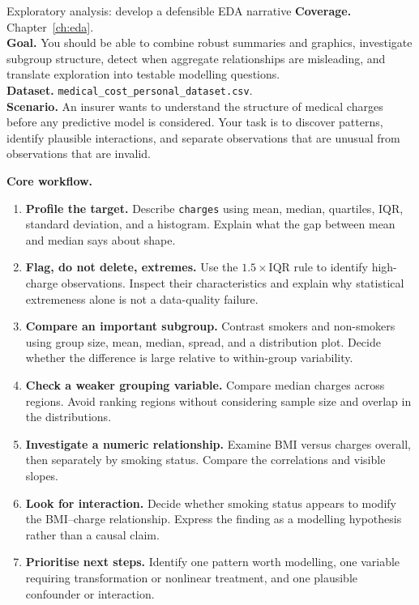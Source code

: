 
\begin{labproject}{Exploratory analysis: develop a defensible EDA narrative}
\textbf{Coverage.} Chapter~\ref{ch:eda}.\\
\textbf{Goal.} You should be able to combine robust summaries and graphics, investigate subgroup structure, detect when aggregate relationships are misleading, and translate exploration into testable modelling questions.\\
\textbf{Dataset.} \texttt{medical\_cost\_personal\_dataset.csv}.\\
\textbf{Scenario.} An insurer wants to understand the structure of medical charges before any predictive model is considered. Your task is to discover patterns, identify plausible interactions, and separate observations that are unusual from observations that are invalid.

\textbf{Core workflow.}
\begin{enumerate}
  \item \textbf{Profile the target.} Describe \texttt{charges} using mean, median, quartiles, IQR, standard deviation, and a histogram. Explain what the gap between mean and median says about shape.
  \item \textbf{Flag, do not delete, extremes.} Use the $1.5\times\mathrm{IQR}$ rule to identify high-charge observations. Inspect their characteristics and explain why statistical extremeness alone is not a data-quality failure.
  \item \textbf{Compare an important subgroup.} Contrast smokers and non-smokers using group size, mean, median, spread, and a distribution plot. Decide whether the difference is large relative to within-group variability.
  \item \textbf{Check a weaker grouping variable.} Compare median charges across regions. Avoid ranking regions without considering sample size and overlap in the distributions.
  \item \textbf{Investigate a numeric relationship.} Examine BMI versus charges overall, then separately by smoking status. Compare the correlations and visible slopes.
  \item \textbf{Look for interaction.} Decide whether smoking status appears to modify the BMI--charge relationship. Express the finding as a modelling hypothesis rather than a causal claim.
  \item \textbf{Prioritise next steps.} Identify one pattern worth modelling, one variable requiring transformation or nonlinear treatment, and one plausible confounder or interaction.
\end{enumerate}


\end{labproject}
